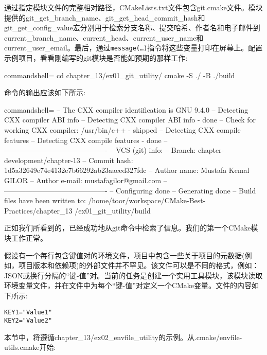 通过指定模块文件的完整相对路径，CMakeLists.txt文件包含git.cmake文件。模块提供的git\_get\_branch\_name、git\_get\_head\_commit\_hash和git\_get\_config\_value宏分别用于检索分支名称、提交哈希、作者名和电子邮件到current\_branch\_name、current\_head、current\_user\_name和current\_user\_email。最后，通过\texttt{message(…)}指令将这些变量打印在屏幕上。配置示例项目，看看刚编写的git模块是否能如预期的那样工作:

\begin{tcblisting}{commandshell={}}
cd chapter_13/ex01_git_utility/
cmake -S ./ -B ./build
\end{tcblisting}

命令的输出应该如下所示:

\begin{tcblisting}{commandshell={}}
-- The CXX compiler identification is GNU 9.4.0
-- Detecting CXX compiler ABI info
-- Detecting CXX compiler ABI info - done
-- Check for working CXX compiler: /usr/bin/c++ - skipped
-- Detecting CXX compile features
-- Detecting CXX compile features - done
-- -------------------------------------------
-- VCS (git) info:
-- Branch: chapter-development/chapter-13
-- Commit hash: 1d5a32649e74e4132e7b66292ab23aaeed327fdc
-- Author name: Mustafa Kemal GILOR
-- Author e-mail: mustafagilor@gmail.com
-- -------------------------------------------
-- Configuring done
-- Generating done
-- Build files have been written to:
/home/toor/workspace/CMake-Best-Practices/chapter_13
/ex01_git_utility/build
\end{tcblisting}

正如我们所看到的，已经成功地从git命令中检索了信息。我们的第一个CMake模块工作正常。


假设有一个每行包含键值对的环境文件，项目中包含一些关于项目的元数据(例如，项目版本和依赖项)的外部文件并不罕见。该文件可以是不同的格式，例如：JSON或换行分隔的“键-值”对。当前的任务是创建一个实用工具模块，该模块读取环境变量文件，并在文件中为每个“键-值”对定义一个CMake变量。文件的内容如下所示:

\begin{lstlisting}[style=styleCMake]
KEY1="Value1"
KEY2="Value2"
\end{lstlisting}

本节中，将遵循chapter\_13/ex02\_envfile\_utility的示例。从.cmake/envfile-utils.cmake开始:

